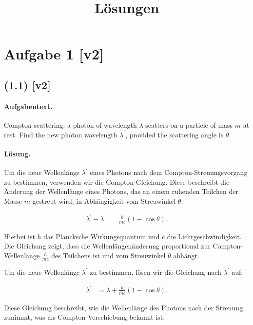 \documentclass[11pt,a4paper]{article}
\title{Lösungen}
\date{}
\begin{document}
\maketitle

\section*{Aufgabe 1 [v2]}
\subsection*{(1.1) [v2]}
\paragraph{Aufgabentext.}
Compton scattering: a photon of wavelength $\lambda$ scatters on a particle of mass $m$ at rest. Find the new photon wavelength $\lambda^{\prime}$, provided the scattering angle is $\theta$.

\paragraph{Lösung.}
Um die neue Wellenlänge $\lambda^{\prime}$ eines Photons nach dem Compton-Streuungsvorgang zu bestimmen, verwenden wir die Compton-Gleichung. Diese beschreibt die Änderung der Wellenlänge eines Photons, das an einem ruhenden Teilchen der Masse $m$ gestreut wird, in Abhängigkeit vom Streuwinkel $\theta$:

\begin{align*}
\lambda^{\prime} - \lambda &= \frac{h}{m c} (1 - \cos \theta).
\end{align*}

Hierbei ist $h$ das Plancksche Wirkungsquantum und $c$ die Lichtgeschwindigkeit. Die Gleichung zeigt, dass die Wellenlängenänderung proportional zur Compton-Wellenlänge $\frac{h}{m c}$ des Teilchens ist und vom Streuwinkel $\theta$ abhängt. 

Um die neue Wellenlänge $\lambda^{\prime}$ zu bestimmen, lösen wir die Gleichung nach $\lambda^{\prime}$ auf:

\begin{align*}
\lambda^{\prime} &= \lambda + \frac{h}{m c} (1 - \cos \theta).
\end{align*}

Diese Gleichung beschreibt, wie die Wellenlänge des Photons nach der Streuung zunimmt, was als Compton-Verschiebung bekannt ist.

\end{document}
